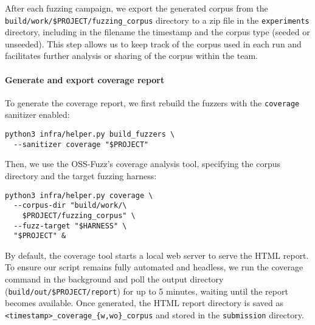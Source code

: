 After each fuzzing campaign, we export the generated corpus from the \texttt{build/work/\$PROJECT/fuzzing\_corpus} directory to a zip file in the \texttt{experiments} directory, including in the filename the timestamp and the corpus type (seeded or unseeded). This step allows us to keep track of the corpus used in each run and facilitates further analysis or sharing of the corpus within the team.

\noindent \paragraph{Generate and export coverage report}

To generate the coverage report, we first rebuild the fuzzers with the \texttt{coverage} sanitizer enabled:

\begin{verbatim}
python3 infra/helper.py build_fuzzers \
  --sanitizer coverage "$PROJECT"
\end{verbatim}

Then, we use the OSS-Fuzz's coverage analysis tool, specifying the corpus directory and the target fuzzing harness:

\begin{verbatim}
python3 infra/helper.py coverage \
  --corpus-dir "build/work/\
    $PROJECT/fuzzing_corpus" \
  --fuzz-target "$HARNESS" \
  "$PROJECT" &
    \end{verbatim}

By default, the coverage tool starts a local web server to serve the HTML report. To ensure our script remains fully automated and headless, we run the coverage command in the background and poll the output directory (\texttt{build/out/\$PROJECT/report}) for up to 5 minutes, waiting until the report becomes available. Once generated, the HTML report directory is saved as \texttt{<timestamp>\_coverage\_{\{w,wo\}\_corpus}} and stored in the \texttt{submission} directory.

